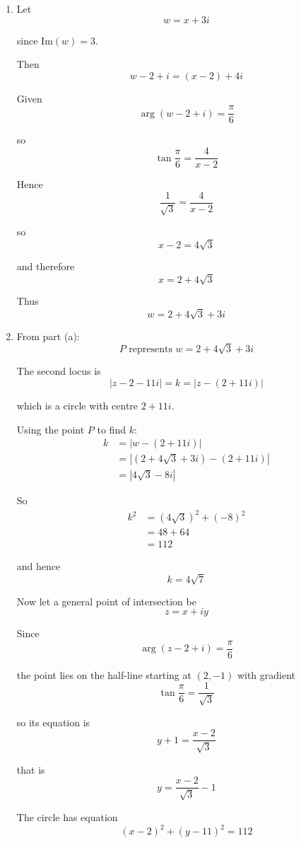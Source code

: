 \documentclass[leqno]{article}
\begin{document}
\begin{enumerate}[
  label=\textbf{\arabic*.},
  leftmargin=*,
  topsep=0pt,
  partopsep=0pt,
  parsep=0pt
]
\begin{djsSolution}
\begin{enumerate}[label=\textbf{(\alph*)}]
  \item Let
  \[
  w=x+3i
  \]

  since $\mathrm{Im}(w)=3$.

  Then
  \[
  w-2+i=(x-2)+4i
  \]

  Given
  \[
  \arg(w-2+i)=\frac{\pi}{6}
  \]

  so
  \[
  \tan\frac{\pi}{6}=\frac{4}{x-2}
  \]

  Hence
  \[
  \frac{1}{\sqrt{3}}=\frac{4}{x-2}
  \]

  so
  \[
  x-2=4\sqrt{3}
  \]

  and therefore
  \[
  x=2+4\sqrt{3}
  \]

  Thus
  \[
  w=2+4\sqrt{3}+3i
  \]

  \item From part (a):
  \[
  P \text{ represents } w=2+4\sqrt{3}+3i
  \]

  The second locus is
  \[
  \lvert z-2-11i\rvert=k=\lvert z-(2+11i)\rvert
  \]

  which is a circle with centre $2+11i$.

  Using the point $P$ to find $k$:
  \begin{align*}
  k&=\left|w-(2+11i)\right| \\
   &=\left|(2+4\sqrt{3}+3i)-(2+11i)\right| \\
   &=\left|4\sqrt{3}-8i\right|
  \end{align*}

  So
  \begin{align*}
  k^2&=(4\sqrt{3})^2+(-8)^2 \\
     &=48+64 \\
     &=112
  \end{align*}

  and hence
  \[
  k=4\sqrt{7}
  \]

  Now let a general point of intersection be
  \[
  z=x+iy
  \]

  Since
  \[
  \arg(z-2+i)=\frac{\pi}{6}
  \]

  the point lies on the half-line starting at $(2,-1)$ with gradient
  \[
  \tan\frac{\pi}{6}=\frac{1}{\sqrt{3}}
  \]

  so its equation is
  \[
  y+1=\frac{x-2}{\sqrt{3}}
  \]

  that is
  \[
  y=\frac{x-2}{\sqrt{3}}-1
  \]

  The circle has equation
  \[
  (x-2)^2+(y-11)^2=112
  \]


\end{enumerate}
\end{djsSolution}
\end{enumerate}
\end{document}
